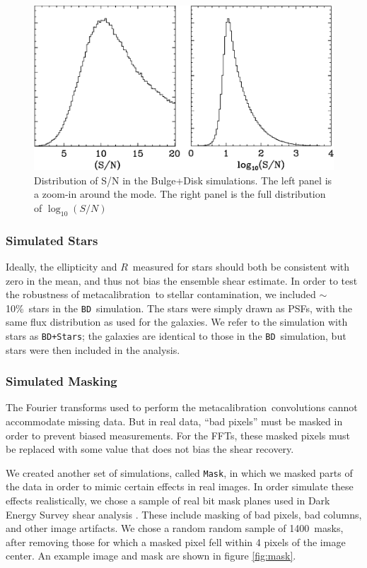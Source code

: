 \documentclass[usegraphicx,usenatbib]{mn2e}
\newcommand{\nmasks}{1400}
\newcommand{\mcal}{metacalibration}
\newcommand{\mcalR}{$R$}
\newcommand{\nsimNstarperc}{10\%}
\newcommand{\bdsim}{\texttt{BD}}
\newcommand{\bdstar}{\texttt{BD+Stars}}
\newcommand{\bdmask}{\texttt{Mask}}
\begin{document}
\begin{figure}
    \centering
    \includegraphics[scale=0.45]{s2n-bd29.eps}

    \caption{Distribution of S/N in the Bulge+Disk simulations. The
    left panel is a zoom-in around the mode.  The right panel is
the full distribution of $\log_{10}(S/N)$}

\label{fig:s2n}
\end{figure}

\subsubsection{Simulated Stars}

Ideally, the ellipticity and \mcalR\ measured for stars should both be
consistent with zero in the mean, and thus not bias the ensemble shear
estimate.  In order to test the robustness of \mcal\ to stellar contamination,
we included $\sim$\nsimNstarperc\ stars in the \bdsim\ simulation.  The stars
were simply drawn as PSFs, with the same flux distribution as used for the
galaxies.  We refer to the simulation with stars as \bdstar; the
galaxies are identical to those in the \bdsim\ simulation, but stars
were then included in the analysis.

\subsubsection{Simulated Masking}

The Fourier transforms used to perform the \mcal\ convolutions cannot
accommodate missing data.  But in real data, ``bad pixels'' must be masked in
order to prevent biased measurements. For the FFTs, these masked pixels must be
replaced with some value that does not bias the shear recovery.

We created another set of simulations, called \bdmask, in which we masked
parts of the data in order to mimic certain effects in real images.  In order
simulate these effects realistically, we chose a sample of real bit mask planes
used in Dark Energy Survey shear analysis \citep{DESSVShear}.  These include
masking of bad pixels, bad columns, and other image artifacts.   We chose a random
random sample of \nmasks\ masks, after removing those for which a masked pixel
fell within 4 pixels of the image center.  An example image and mask are shown
in figure \ref{fig:mask}.
\end{document}
